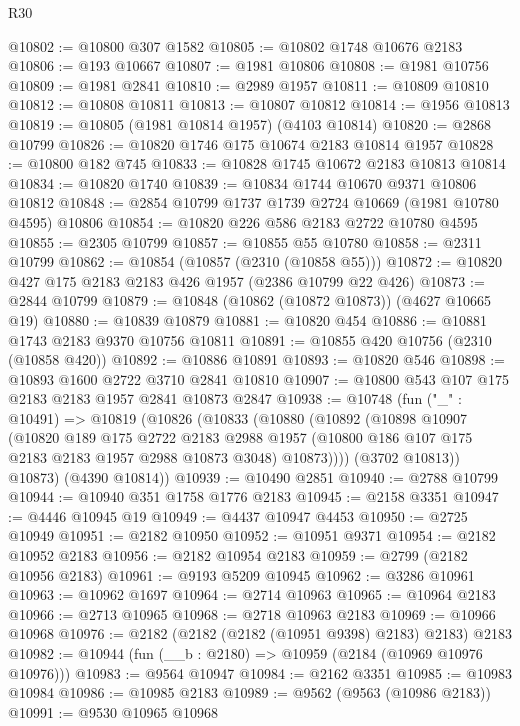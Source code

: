 \begin{lexlean}{R30}
\begin{coremodule}
@10802 := @10800 @307 @1582
@10805 := @10802 @1748 @10676 @2183
@10806 := @193 @10667
@10807 := @1981 @10806
@10808 := @1981 @10756
@10809 := @1981 @2841
@10810 := @2989 @1957
@10811 := @10809 @10810
@10812 := @10808 @10811
@10813 := @10807 @10812
@10814 := @1956 @10813
@10819 := @10805 (@1981 @10814 @1957) (@4103 @10814)
@10820 := @2868 @10799
@10826 := @10820 @1746 @175 @10674 @2183 @10814 @1957
@10828 := @10800 @182 @745
@10833 := @10828 @1745 @10672 @2183 @10813 @10814
@10834 := @10820 @1740
@10839 := @10834 @1744 @10670 @9371 @10806 @10812
@10848 := @2854 @10799 @1737 @1739 @2724 @10669 (@1981 @10780 @4595) @10806
@10854 := @10820 @226 @586 @2183 @2722 @10780 @4595
@10855 := @2305 @10799
@10857 := @10855 @55 @10780
@10858 := @2311 @10799
@10862 := @10854 (@10857 (@2310 (@10858 @55)))
@10872 := @10820 @427 @175 @2183 @2183 @426 @1957 (@2386 @10799 @22 @426)
@10873 := @2844 @10799
@10879 := @10848 (@10862 (@10872 @10873)) (@4627 @10665 @19)
@10880 := @10839 @10879
@10881 := @10820 @454
@10886 := @10881 @1743 @2183 @9370 @10756 @10811
@10891 := @10855 @420 @10756 (@2310 (@10858 @420))
@10892 := @10886 @10891
@10893 := @10820 @546
@10898 := @10893 @1600 @2722 @3710 @2841 @10810
@10907 := @10800 @543 @107 @175 @2183 @2183 @1957 @2841 @10873 @2847
@10938 := @10748
    (fun ("_" : @10491) =>
    @10819
      (@10826
        (@10833
          (@10880
            (@10892
              (@10898
                @10907
                (@10820
                  @189
                  @175
                  @2722
                  @2183
                  @2988
                  @1957
                  (@10800 @186 @107 @175 @2183 @2183 @1957 @2988 @10873 @3048)
                  @10873))))
          (@3702 @10813))
        @10873)
      (@4390 @10814))
@10939 := @10490 @2851
@10940 := @2788 @10799
@10944 := @10940 @351 @1758 @1776 @2183
@10945 := @2158 @3351
@10947 := @4446 @10945 @19
@10949 := @4437 @10947 @4453
@10950 := @2725 @10949
@10951 := @2182 @10950
@10952 := @10951 @9371
@10954 := @2182 @10952 @2183
@10956 := @2182 @10954 @2183
@10959 := @2799 (@2182 @10956 @2183)
@10961 := @9193 @5209 @10945
@10962 := @3286 @10961
@10963 := @10962 @1697
@10964 := @2714 @10963
@10965 := @10964 @2183
@10966 := @2713 @10965
@10968 := @2718 @10963 @2183
@10969 := @10966 @10968
@10976 := @2182 (@2182 (@2182 (@10951 @9398) @2183) @2183) @2183
@10982 := @10944 (fun (__b : @2180) => @10959 (@2184 (@10969 @10976 @10976)))
@10983 := @9564 @10947
@10984 := @2162 @3351
@10985 := @10983 @10984
@10986 := @10985 @2183
@10989 := @9562 (@9563 (@10986 @2183))
@10991 := @9530 @10965 @10968

\end{coremodule}
\end{lexlean}
